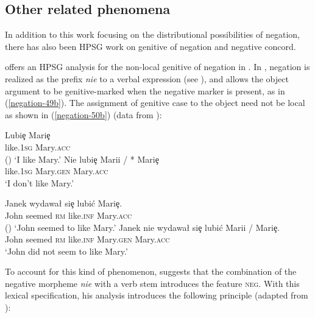 \documentclass[output=paper
 	        ,biblatex
                ,babelshorthands
                ,newtxmath
                ,draftmode
                ,colorlinks, citecolor=brown
]{langscibook}
\begin{document}
\begin{exe}
\begin{xlist}
\section{Other related phenomena}
\label{negation:sec-other-phenomena}

In addition to this work focusing on the distributional possibilities of negation, there has also
been HPSG work on genitive of negation and negative concord.

\citet{Prz:00} offers an HPSG analysis for the non-local genitive of negation in .  In
, negation is realized as the prefix \emph{nie} to a verbal expression (see
\citealt{PK:99, Prz:00, Prz:01}), and  allows the object argument to be genitive-marked
when the negative marker is present, as in (\ref{negation-49b}).  The assignment of genitive case
to the object need not be local as shown in (\ref{negation-50b}) (data from \citealt[]{Prz:00}):

\eal
\ex  \label{negation-genitive}
\gll Lubi\c{e} Mari\c{e} \\
     like.1\textsc{sg} Mary.\textsc{acc}\\\hfill()
\glt `I like Mary.'
\ex \label{negation-49b}
\gll Nie lubi\c{e} Marii / * Mari\c{e} \\
     \NEG{} like.1\textsc{sg} Mary.\textsc{gen} {} {} Mary.\textsc{acc}\\
\glt `I don't like Mary.'
\zl

\eal
\ex \label{negation-genitive-1}
\gll  Janek wydawa\l{} si\c{e} lubi\'{c} Mari\c{e}.\\
      John seemed \textsc{rm}     like.\textsc{inf} Mary.\textsc{acc}\\\hfill()
\glt `John seemed to like Mary.'
\ex \label{negation-50b}
\gll  Janek nie wydawa\l{} si\c{e} lubi\'{c} Marii / Mari\c{e}.\\
      John \NEG{} seemed \textsc{rm} like.\textsc{inf}      Mary.\textsc{gen} {} Mary.\textsc{acc}\\
\glt `John did not seem to like Mary.'
\zl

\noindent
To account for this kind of phenomenon, \citet{Prz:00}
suggests that the combination of the
negative morpheme \emph{nie} with a verb stem introduces the
feature \textsc{neg}.
With this lexical specification, his analysis introduces
 the following principle (adapted from \citealt[]{Prz:00}):


\end{xlist}
\end{exe}
\end{document}
